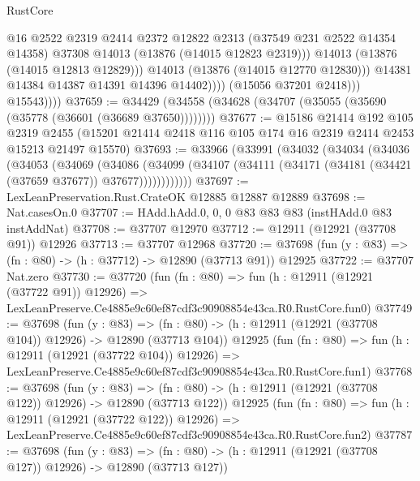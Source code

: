 \begin{lexlean}{RustCore}
\begin{coremodule}
                              @16
                              @2522
                              @2319
                              @2414
                              @2372
                              @12822
                              @2313
                              (@37549 @231 @2522 @14354 @14358)
                              @37308
                              @14013
                              (@13876 (@14015 @12823 @2319)))
                            @14013
                            (@13876 (@14015 @12813 @12829)))
                          @14013
                          (@13876 (@14015 @12770 @12830)))
                        @14381
                        @14384
                        @14387
                        @14391
                        @14396
                        @14402))))
                (@15056 @37201 @2418)))
            @15543))))
@37659 := @34429 (@34558 (@34628 (@34707 (@35055 (@35690 (@35778 (@36601 (@36689 @37650))))))))
@37677 := @15186
    @21414
    @192
    @105
    @2319
    @2455
    (@15201 @21414 @2418 @116 @105 @174 @16 @2319 @2414 @2453 @15213 @21497 @15570)
@37693 := @33966
    (@33991
      (@34032
        (@34034
          (@34036
            (@34053
              (@34069
                (@34086
                  (@34099
                    (@34107 (@34111 (@34171 (@34181 (@34421 (@37659 @37677)) @37677))))))))))))
@37697 := LexLeanPreservation.Rust.CrateOK @12885 @12887 @12889
@37698 := Nat.casesOn.{0}
@37707 := HAdd.hAdd.{0, 0, 0} @83 @83 @83 (instHAdd.{0} @83 instAddNat)
@37708 := @37707 @12970
@37712 := @12911 (@12921 (@37708 @91)) @12926
@37713 := @37707 @12968
@37720 := @37698 (fun (y : @83) => (fn : @80) -> (h : @37712) -> @12890 (@37713 @91)) @12925
@37722 := @37707 Nat.zero
@37730 := @37720
    (fun (fn : @80) =>
    fun (h : @12911 (@12921 (@37722 @91)) @12926) =>
    LexLeanPreserve.Ce4885e9c60ef87cdf3c90908854e43ca.R0.RustCore.fun0)
@37749 := @37698
    (fun (y : @83) =>
    (fn : @80) -> (h : @12911 (@12921 (@37708 @104)) @12926) -> @12890 (@37713 @104))
    @12925
    (fun (fn : @80) =>
    fun (h : @12911 (@12921 (@37722 @104)) @12926) =>
    LexLeanPreserve.Ce4885e9c60ef87cdf3c90908854e43ca.R0.RustCore.fun1)
@37768 := @37698
    (fun (y : @83) =>
    (fn : @80) -> (h : @12911 (@12921 (@37708 @122)) @12926) -> @12890 (@37713 @122))
    @12925
    (fun (fn : @80) =>
    fun (h : @12911 (@12921 (@37722 @122)) @12926) =>
    LexLeanPreserve.Ce4885e9c60ef87cdf3c90908854e43ca.R0.RustCore.fun2)
@37787 := @37698
    (fun (y : @83) =>
    (fn : @80) -> (h : @12911 (@12921 (@37708 @127)) @12926) -> @12890 (@37713 @127))

\end{coremodule}
\end{lexlean}
